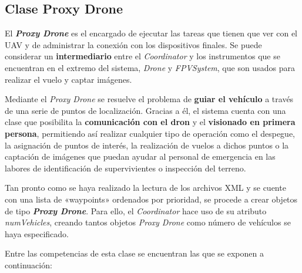 \subsection{Clase Proxy Drone}

El \textbf{\textit{Proxy Drone}} es el encargado de ejecutar las tareas que tienen que ver con el \acs{UAV} y de administrar la conexión con los dispositivos finales. Se puede considerar un \textbf{intermediario} entre el \textit{Coordinator} y los instrumentos que se encuentran en el extremo del sistema, \textit{Drone} y \textit{FPVSystem}, que son usados para realizar el vuelo y captar imágenes.

Mediante el \textit{Proxy Drone} se resuelve el problema de \textbf{guiar el vehículo} a través de una serie de puntos de localización. Gracias a él, el sistema cuenta con una clase que posibilita la \textbf{comunicación con el dron} y el \textbf{visionado en primera persona}, permitiendo así realizar cualquier tipo de operación como el despegue, la asignación de puntos de interés, la realización de vuelos a dichos puntos o la captación de imágenes que puedan ayudar al personal de emergencia en las labores de identificación de supervivientes o inspección del terreno.

Tan pronto como se haya realizado la lectura de los archivos XML y se cuente con una lista de «waypoints» ordenados por prioridad, se procede a crear objetos de tipo \textbf{\textit{Proxy Drone}}. 
Para ello, el \textit{Coordinator} hace uso de su atributo \textit{numVehicles}, creando tantos objetos \textit{Proxy Drone} como número de vehículos se haya especificado.

Entre las competencias de esta clase se encuentran las que se exponen a continuación:


